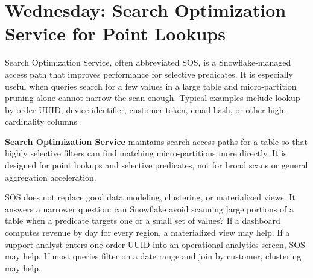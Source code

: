 \section{Wednesday: Search Optimization Service for Point Lookups}
Search Optimization Service, often abbreviated SOS, is a Snowflake-managed access path that improves performance for selective predicates. It is especially useful when queries search for a few values in a large table and micro-partition pruning alone cannot narrow the scan enough. Typical examples include lookup by order UUID, device identifier, customer token, email hash, or other high-cardinality columns \cite{snowflakeSearchOptimizationDocs}.
\begin{definitionbox}
\textbf{Search Optimization Service} maintains search access paths for a table so that highly selective filters can find matching micro-partitions more directly. It is designed for point lookups and selective predicates, not for broad scans or general aggregation acceleration.
\end{definitionbox}
SOS does not replace good data modeling, clustering, or materialized views. It answers a narrower question: can Snowflake avoid scanning large portions of a table when a predicate targets one or a small set of values? If a dashboard computes revenue by day for every region, a materialized view may help. If a support analyst enters one order UUID into an operational analytics screen, SOS may help. If most queries filter on a date range and join by customer, clustering may help.
